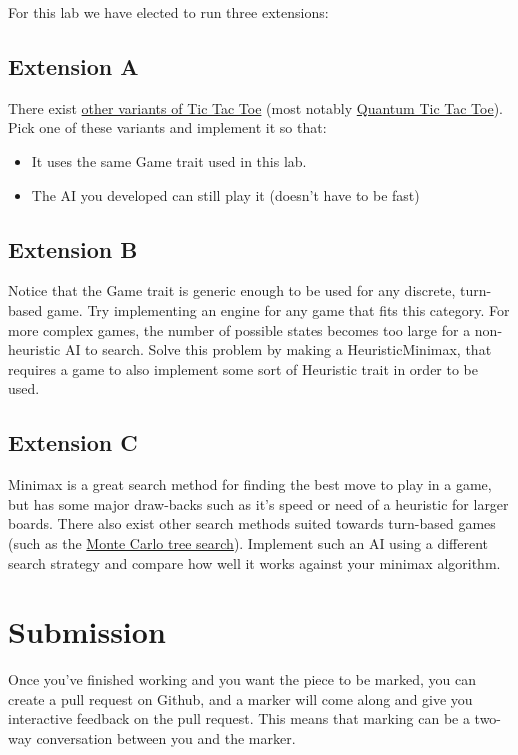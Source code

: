 \documentclass{report}
\begin{document}
For this lab we have elected to run three extensions:
\subsection*{Extension A}
There exist \href{https://en.wikipedia.org/wiki/Tic-tac-toe_variants}{other variants of Tic Tac Toe} (most notably \href{https://en.wikipedia.org/wiki/Quantum_tic-tac-toe}{Quantum Tic Tac Toe}).
Pick one of these variants and implement it so that:
\begin{itemize}
    \item It uses the same Game trait used in this lab.
    \item The AI you developed can still play it (doesn't have to be fast)
\end{itemize}

\subsection*{Extension B} 
Notice that the Game trait is generic enough to be used for any discrete, turn-based game.
Try implementing an engine for any game that fits this category. For more complex games,
the number of possible states becomes too large for a non-heuristic AI to search.
Solve this problem by making a HeuristicMinimax, that requires a game to also implement 
some sort of Heuristic trait in order to be used.

\subsection*{Extension C}
Minimax is a great search method for finding the best move to play in a game, but
has some major draw-backs such as it's speed or need of a heuristic for larger boards. There also 
exist other search methods suited towards turn-based games (such as the \href{https://en.wikipedia.org/wiki/Monte_Carlo_tree_search}{Monte Carlo tree search}).
Implement such an AI using a different search strategy and compare how well it works
against your minimax algorithm.

\section*{Submission}
Once you've finished working and you want the piece to be marked, you can create 
a pull request on Github, and a marker will come along and give you interactive
feedback on the pull request. This means that marking can be a two-way conversation
between you and the marker.
\end{document}
